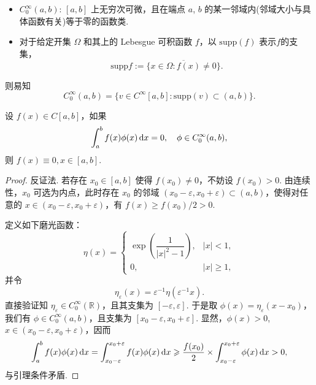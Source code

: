 \begin{itemize}
    \item $C_0^{\infty}(a,b)$: $[a,b]$ 上无穷次可微，且在端点 $a$, $b$ 的某一邻域内(邻域大小与具体函数有关)等于零的函数类.
    \item 对于给定开集 $\Omega$ 和其上的 Lebesgue 可积函数 $f$，以 $\mathrm{supp}(f)$ 表示$f$的支集，
    \begin{equation*}
        \mathrm{supp} f := \overline{\{x\in\Omega: f(x)\neq 0\}}.
    \end{equation*}
\end{itemize}

则易知
\begin{equation*}
    C_0^{\infty}(a,b) = \{v\in C^{\infty}[a,b]: \mathrm{supp}(v) \subset (a,b)\}.
\end{equation*}

\begin{lemma}
设 $f(x) \in C[a,b]$，如果
\begin{equation}\label{eq:变分学基本引理条件}
    \int_a^b f(x)\phi(x)\mathop{}\!\mathrm{d} x = 0, \quad \phi \in C_0^{\infty}(a,b),
\end{equation}
则 $f(x) \equiv 0, x \in [a,b].$
\end{lemma}
\begin{proof}
    反证法. 若存在 $x_0 \in [a,b]$ 使得 $f(x_0) \neq 0$，不妨设 $f(x_0) > 0$. 由连续性，$x_0$ 可选为内点，此时存在 $x_0$ 的邻域 $(x_0 - \varepsilon, x_0 + \varepsilon) \subset (a, b)$，使得对任意的 $x \in (x_0 - \varepsilon, x_0 + \varepsilon)$，有 $f(x) \geq f(x_0) / 2 > 0$.
    
    定义如下磨光函数：
    \begin{equation*}
        \eta(x) = \begin{cases} \exp \left( \dfrac{1}{|x|^2 - 1} \right), & |x| < 1, \\ 0, & |x| \geq 1, \end{cases}
    \end{equation*}
    并令
    \begin{equation*}
        \eta_\varepsilon(x) = \varepsilon^{-1} \eta(\varepsilon^{-1} x).
    \end{equation*}
    直接验证知 $\eta_\varepsilon \in C_0^\infty(\mathbb{R})$，且其支集为 $[-\varepsilon, \varepsilon]$. 于是取 $\phi(x) = \eta_\varepsilon(x - x_0)$，我们有 $\phi \in C_0^\infty(a, b)$，且支集为 $[x_0 - \varepsilon, x_0 + \varepsilon]$. 显然，$\phi(x) > 0$, $x \in (x_0 - \varepsilon, x_0 + \varepsilon)$，因而
    \begin{equation*}
        \int_a^b f(x)\phi(x)\mathop{}\!\mathrm{d} x = \int_{x_0-\varepsilon}^{x_0+\varepsilon} f(x)\phi(x)\mathop{}\!\mathrm{d} x \geqslant \frac{f(x_0)}{2} \times \int_{x_0-\varepsilon}^{x_0+\varepsilon} \phi(x)\mathop{}\!\mathrm{d} x > 0,
    \end{equation*}
    与引理条件矛盾.
\end{proof}



